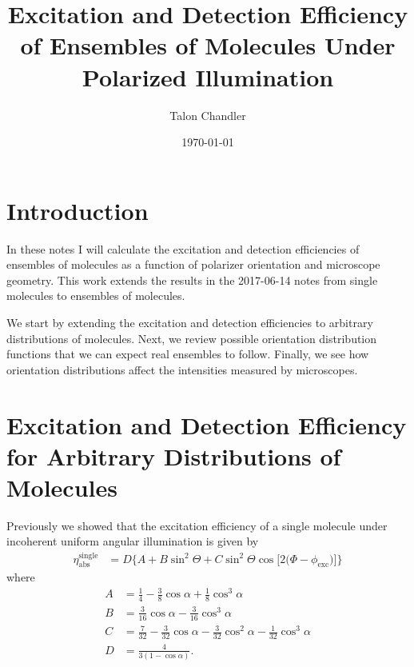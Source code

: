 \documentclass[11pt]{article}
\begin{document}
\title{\vspace{-2.5em} Excitation and Detection Efficiency of Ensembles of
  Molecules Under Polarized Illumination \vspace{-1em}} \author{Talon
  Chandler}%
\date{\vspace{-1em}\today\vspace{-1em}}
\maketitle
\section{Introduction}
In these notes I will calculate the excitation and detection efficiencies of
ensembles of molecules as a function of polarizer orientation and microscope
geometry. This work extends the results in the 2017-06-14 notes from single
molecules to ensembles of molecules.

We start by extending the excitation and detection efficiencies to arbitrary
distributions of molecules. Next, we review possible orientation distribution
functions that we can expect real ensembles to follow. Finally, we see how
orientation distributions affect the intensities measured by microscopes.

\section{Excitation and Detection Efficiency for Arbitrary Distributions of Molecules}
Previously we showed that the excitation efficiency of a single molecule under
incoherent uniform angular illumination is given by
\begin{align}
  \eta_{\text{abs}}^{\text{single}} &= D\{A + B\sin^{2}{\Theta} + C\sin^{2}{\Theta} \cos{[2 (\Phi - \phi_{\text{exc}}})]\}\label{eq:scalarabs}
\end{align}
where
\begin{subequations}
\begin{align}
  A &= \frac{1}{4} - \frac{3}{8} \cos{\alpha } + \frac{1}{8} \cos^{3}{\alpha }\\
  B &= \frac{3}{16} \cos{\alpha } - \frac{3}{16} \cos^{3}{\alpha }\\
  C &= \frac{7}{32} - \frac{3}{32} \cos{\alpha } - \frac{3}{32} \cos^{2}{\alpha } - \frac{1}{32} \cos^{3}{\alpha}\\
  D &= \frac{4}{3(1 - \cos\alpha)}.
\end{align}\label{eq:coefficients}%
\end{subequations}
\end{document}
